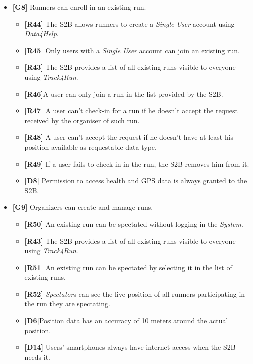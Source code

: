 \documentclass[titlepage]{article}
\begin{document}
\begin{itemize}
\begin{itemize}
					\end{itemize}
					
					\item {\bf [G8]}  Runners can enroll in an existing run.
				 
					 \begin{itemize} %
					 	\item {\bf [R44]} The S2B allows runners to create a {\it Single User} account using {\it Data4Help}.
\item {\bf [R45]} Only users with a {\it Single User} account can join an existing run.
\item {\bf [R43]} The S2B provides a list of all existing runs visible to everyone using {\it Track4Run}.
\item {\bf [R46]}A user can only join a run in the list provided by the S2B.
\item {\bf [R47]} A user can’t check-in for a run if he doesn’t accept the request received by the organiser of such run.
\item {\bf [R48]} A user can’t accept the request if he doesn’t have at least his position available as requestable data type.
\item {\bf [R49]} If a user fails to check-in in the run, the S2B removes him from it.
\item {\bf [D8]} Permission to access health and GPS data is always granted to the S2B.

					\end{itemize}
					
					\item {\bf [G9]}  Organizers can create and manage runs.
				 
					 \begin{itemize} %
					 	\item {\bf [R50]} An existing run can be spectated without logging in the {\it System}.
\item {\bf [R43]} The S2B provides a list of all existing runs visible to everyone using {\it Track4Run}.
\item {\bf [R51]} An existing run can be spectated by selecting it in the list of existing runs.
\item {\bf [R52]} {\it Spectator}s can see the live position of all runners participating in the run they are spectating.
\item {\bf [D6]}Position data has an accuracy of 10 meters around the actual position.
\item {\bf [D14]} Users’ smartphones always have internet access when the S2B needs it.
					\end{itemize}
				 
			\end{itemize}
			
\end{document}
